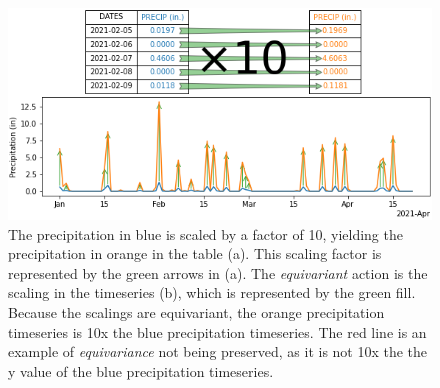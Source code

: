 \documentclass[../main.tex]{subfiles}
\begin{document}
 
\begin{figure}[H]
        \includegraphics[width=1\textwidth]{figures/intro/equivariant.png}
        \caption{The precipitation in blue is scaled by a factor of 10, yielding the precipitation in orange in the table (a). This scaling factor is represented by the green arrows in (a). The \textit{equivariant} action is the scaling in the timeseries (b), which is represented by the green fill. Because the scalings are equivariant, the orange precipitation timeseries is 10x the blue precipitation timeseries. The red line is an example of \textit{equivariance} not being preserved, as it is not 10x the the y value of the blue precipitation timeseries.}
      \label{fig:intro:equivariance}
\end{figure}
\end{document}
